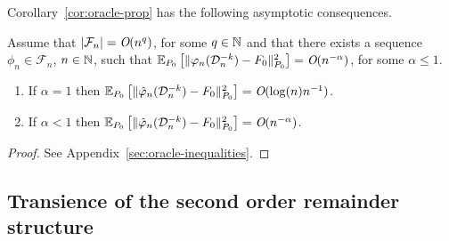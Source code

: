 Corollary~\ref{cor:oracle-prop} has the following asymptotic consequences.

\begin{corollary}
  \label{cor:asymp-cons}
  Assume that \( |\mathcal{F}_n| = \textit{O}(n^q)\), for some \( q \in \mathbb{N} \) and
  that there exists a sequence \( \phi_n \in \mathcal{F}_n \), \( n \in \mathbb{N} \),
  such that
  \( \operatorname{\mathbb{E}}_{P_0}{\left[ \Vert \varphi_n(\mathcal{D}_n^{-k}) - F_{0} \Vert_{P_0}^2 \right]} =
  \textit{O}(n^{-\alpha}) \), for some \( \alpha\leq 1 \).
  \begin{enumerate}[label=(\alph*)]
  \item If $\alpha=1$ then
    \( \operatorname{\mathbb{E}}_{P_0}{\left[ \Vert \hat{\varphi}_n(\mathcal{D}_n^{-k}) - F_0 \Vert_{P_0}^2
      \right]} = \textit{O}(\log(n)n^{-1}) \).
  \item If $\alpha<1$ then
    \( \operatorname{\mathbb{E}}_{P_0}{\left[ \Vert \hat{\varphi}_n(\mathcal{D}_n^{-k}) - F_0 \Vert_{P_0}^2 \right]} =
    \textit{O}(n^{-\alpha}) \).
  \end{enumerate}
\end{corollary}
\begin{proof}
  See Appendix~\ref{sec:oracle-inequalities}.
\end{proof}


\subsection{Transience of the second order remainder structure}
\label{sec:trans-second-order}

